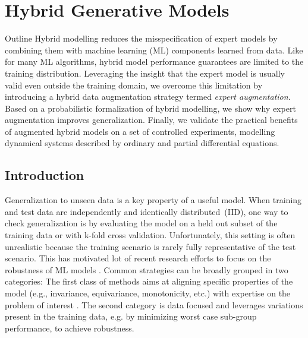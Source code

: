 \chapter{Hybrid Generative Models}\label{ch:07}

\begin{remark}{Outline}
Hybrid modelling reduces the misspecification of expert models by combining them with machine learning (ML) components learned from data. Like for many ML algorithms, hybrid model performance guarantees are limited to the training distribution. Leveraging the insight that the expert model is usually valid even outside the training domain, we overcome this limitation by introducing a hybrid data augmentation strategy termed \textit{expert augmentation}. Based on a probabilistic formalization of hybrid modelling, we show why expert augmentation improves generalization. Finally, we validate the practical benefits of augmented hybrid models on a set of controlled experiments, modelling dynamical systems described by ordinary and partial differential equations.

\end{remark}

\section{Introduction}
Generalization to unseen data is a key property of a useful model. When training and test data are independently and identically distributed~(IID), one way to check generalization is by evaluating the model on a held out subset of the training data or with k-fold cross validation. Unfortunately, this setting is often unrealistic because the training scenario is rarely fully representative of the test scenario. This has motivated lot of recent research efforts to focus on  the robustness of ML models  \citep{gulrajani2020search,geirhos2020shortcut,koh2021wilds}. Common strategies can be broadly grouped in two categories: The first class of methods aims at aligning specific properties of the model (e.g., invariance, equivariance, monotonicity, etc.) with expertise on the problem of interest \citep{cubuk2019autoaugment, graph_net_molecule, universal_equivariance, alphago}. The second category is data focused \citep{groupDRO_ICLR, IRM, krueger2021out, creager2021environment} and leverages variations present in the training data, e.g. by minimizing worst case sub-group performance, to achieve robustness.

